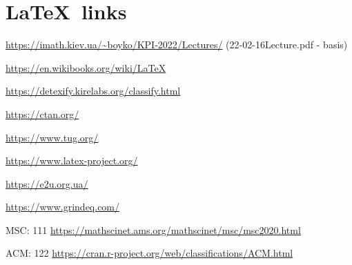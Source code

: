 \documentclass[12pt,fleqn]{article}
\numberwithin{equation}{section}
\numberwithin{figure}{section}
\begin{document}
\large %



\section*{\LaTeX\ links}

\url{https://imath.kiev.ua/~boyko/KPI-2022/Lectures/} (22-02-16Lecture.pdf - basis)

\url{https://en.wikibooks.org/wiki/LaTeX}

\url{https://detexify.kirelabs.org/classify.html}

\url{https://ctan.org/}

\url{https://www.tug.org/}

\url{https://www.latex-project.org/}

\url{https://e2u.org.ua/}

\url{https://www.grindeq.com/}


MSC: 111 \url{https://mathscinet.ams.org/mathscinet/msc/msc2020.html}

ACM: 122 \url{https://cran.r-project.org/web/classifications/ACM.html}
\end{document}
